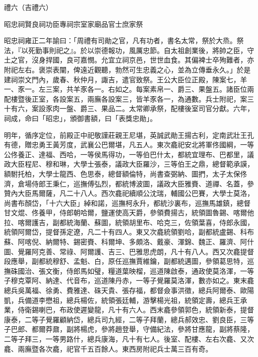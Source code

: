 
\begin{pinyinscope}
禮六（吉禮六）

昭忠祠賢良祠功臣專祠宗室家廟品官士庶家祭

昭忠祠雍正二年諭曰：「周禮有司勛之官，凡有功者，書名太常，祭於大烝。祭法，『以死勤事則祀之』。於以崇德報功，風厲忠節。自太祖創業後，將帥之臣，守土之官，沒身捍國，良可嘉憫。允宜立祠京邑，世世血食。其偏裨士卒殉難者，亦附祀左右。褒崇表闡，俾遠近觀聽，勃然可生忠義之心，並為立傳垂永久。」於是建祠崇文門內，歲春、秋仲月，諏吉，遣官致祭。王公大臣位正殿，陳案七，羊一、豕一。左三案，共羊豕各一。右如之。每案素帛一、爵三、果盤五。諸臣位兩配樓暨後正室，各設案五，兩廡各設案三，皆羊豕各一，為通數。兵士附祀，案三十有六，案設豕肉一盤、爵三、果品二。太常卿承祭，配樓後室司官分獻。六年，祠成，命曰「昭忠」，頒御書額，曰「表獎忠勛」。

明年，循序定位，前殿正中祀敬謹莊親王尼堪，英誠武勛王揚古利，定南武壯王孔有德，贈忠勇王黃芳度，武襄公巴爾堪，凡五人。東次龕祀安北將軍佟國綱，一等公佟養正、達福、西哈，一等侯馬得功，一等伯巴什太，都統宜理布、巴都里，議政大臣程尼、穆和琳，大學士張泰，議政大臣羅沙，三等伯王之鼎，總督範承謨，額駙托柏，大學士龍西、色思泰，總督額倫特，尚書查弼納、圖捫，太子太保佟濟，倉場侍郎王秉仁，巡撫傅弘烈，都統博波圖，議政大臣雅賚、道禪、名蓋，參贊內大臣馬爾薩，凡二十八人。西次龕祀續順公沈瑞，輔國公巴賽，大學士莫洛，尚書布顏岱，「十六大臣」綽和諾，巡撫柯永升，都統沙裏布，巡撫馬雄鎮，總督甘文焜、佟養甲，侍郎朝哈爾，鹽運使高天爵，參領費揚古，統領圖魯錫、喀爾他拉、喀爾護吉，副都統海蘭、蘇圖，統領胡里布、哈克三，佐領葉喜，侍郎永國，統領阿爾岱，提督孫定遼，凡二十有四人。東又次龕統領劉哈，副都統盧錫、科布蘇、阿喀倪、納爾特、錫密賚、科爾坤、多頗洛、戴豪、渾錦、魏正、羅濟、阿什圖、覺羅阿克善、常祿、阿爾護、吉三、巴雅思虎朗，凡十有八人。西又次龕提督段應舉，副都統穆舒、孟魁、白，原任巡撫賈維鑰，副都統邁圖，參領葛思特，巡撫硃國治、張文衡，侍郎馬如璧，糧道葉映榴，巡道陳啟泰，通政使莫洛渾，一等子穆克覃阿、納達、代音布，巡道陳丹赤，一等子覺羅莫洛渾，數亦如之。東末龕總兵吳萬福、徐勇、費雅達、硃天貴、張存福，都督僉事洪徵，總兵阿爾泰、歐陽凱，兵備道李懋祖，總兵楊佐，統領張廷輔，游擊楊光祖，統領定壽，總兵王承業，侍衛錫喇巴，布政使遲變龍，凡十有六人。西末龕參領郭色，統領新泰，提督康泰，二等子覺羅顧納岱，總兵司九經，二等子拜蘭，總兵郝效忠、劉良臣，三等子巴郎、都爾莽鼐，副將楊虎，參將趙登舉，守備紀法，參將甘應龍，副將蔡隆，二等子拜三，一等男路什，總兵康海，凡十有七人。後室、配樓、左右次龕、又次龕、兩廡暨各次龕，祀官千五百餘人。東西房附祀兵士萬三百有奇。


\end{pinyinscope}
